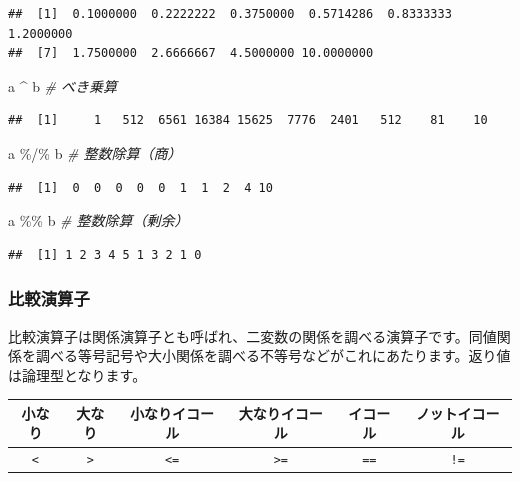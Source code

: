 \documentclass[
  12pt,
]{book}
\newenvironment{Shaded}{\begin{snugshade}}{\end{snugshade}}
\newcommand{\CommentTok}[1]{\textcolor[rgb]{0.56,0.35,0.01}{\textit{#1}}}
\newcommand{\NormalTok}[1]{#1}
\newcommand{\SpecialCharTok}[1]{\textcolor[rgb]{0.00,0.00,0.00}{#1}}
\begin{document}
\begin{verbatim}
##  [1]  0.1000000  0.2222222  0.3750000  0.5714286  0.8333333  1.2000000
##  [7]  1.7500000  2.6666667  4.5000000 10.0000000
\end{verbatim}

\begin{Shaded}
\begin{Highlighting}[numbers=left,,]
\NormalTok{a }\SpecialCharTok{\^{}}\NormalTok{ b         }\CommentTok{\# べき乗算}
\end{Highlighting}
\end{Shaded}

\begin{verbatim}
##  [1]     1   512  6561 16384 15625  7776  2401   512    81    10
\end{verbatim}

\begin{Shaded}
\begin{Highlighting}[numbers=left,,]
\NormalTok{a }\SpecialCharTok{\%/\%}\NormalTok{ b       }\CommentTok{\# 整数除算（商）}
\end{Highlighting}
\end{Shaded}

\begin{verbatim}
##  [1]  0  0  0  0  0  1  1  2  4 10
\end{verbatim}

\begin{Shaded}
\begin{Highlighting}[numbers=left,,]
\NormalTok{a }\SpecialCharTok{\%\%}\NormalTok{ b        }\CommentTok{\# 整数除算（剰余）}
\end{Highlighting}
\end{Shaded}

\begin{verbatim}
##  [1] 1 2 3 4 5 1 3 2 1 0
\end{verbatim}

\hypertarget{ux6bd4ux8f03ux6f14ux7b97ux5b50}{%
\subsubsection{比較演算子}\label{ux6bd4ux8f03ux6f14ux7b97ux5b50}}

比較演算子は関係演算子とも呼ばれ、二変数の関係を調べる演算子です。同値関係を調べる等号記号や大小関係を調べる不等号などがこれにあたります。返り値は論理型となります。

\begin{longtable}[]{@{}cccccc@{}}
\toprule
小なり & 大なり & 小なりイコール & 大なりイコール & イコール & ノットイコール \\
\midrule
\endhead
\texttt{\textless{}} & \texttt{\textgreater{}} & \texttt{\textless{}=} & \texttt{\textgreater{}=} & \texttt{==} & \texttt{!=} \\
\bottomrule
\end{longtable}
\end{document}
